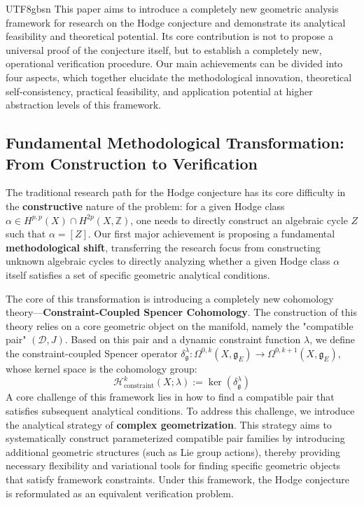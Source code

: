 \documentclass[a4paper,12pt]{extarticle}
\theoremstyle{definition}
\begin{document}
\begin{CJK}{UTF8}{gbsn}
This paper aims to introduce a completely new geometric analysis framework for research on the Hodge conjecture and demonstrate its analytical feasibility and theoretical potential. Its core contribution is not to propose a universal proof of the conjecture itself, but to establish a completely new, operational verification procedure. Our main achievements can be divided into four aspects, which together elucidate the methodological innovation, theoretical self-consistency, practical feasibility, and application potential at higher abstraction levels of this framework.

\subsection{Fundamental Methodological Transformation: From Construction to Verification}

The traditional research path for the Hodge conjecture has its core difficulty in the \textbf{constructive} nature of the problem: for a given Hodge class $\alpha \in H^{p,p}(X) \cap H^{2p}(X, \mathbb{Z})$, one needs to directly construct an algebraic cycle $Z$ such that $\alpha = [Z]$. Our first major achievement is proposing a fundamental \textbf{methodological shift}, transferring the research focus from constructing unknown algebraic cycles to directly analyzing whether a given Hodge class $\alpha$ itself satisfies a set of specific geometric analytical conditions.

The core of this transformation is introducing a completely new cohomology theory—\textbf{Constraint-Coupled Spencer Cohomology}. The construction of this theory relies on a core geometric object on the manifold, namely the "compatible pair" $(\mathcal{D}, J)$. Based on this pair and a dynamic constraint function $\lambda$, we define the constraint-coupled Spencer operator $\delta^\lambda_\mathfrak{g}: \Omega^{0,k}(X, \mathfrak{g}_E) \to \Omega^{0,k+1}(X, \mathfrak{g}_E)$, whose kernel space is the cohomology group:
\begin{equation}
\mathcal{H}_{\text{constraint}}^{k}(X; \lambda) := \ker(\delta^\lambda_\mathfrak{g})
\end{equation}
A core challenge of this framework lies in how to find a compatible pair that satisfies subsequent analytical conditions. To address this challenge, we introduce the analytical strategy of \textbf{complex geometrization}. This strategy aims to systematically construct parameterized compatible pair families by introducing additional geometric structures (such as Lie group actions), thereby providing necessary flexibility and variational tools for finding specific geometric objects that satisfy framework constraints. Under this framework, the Hodge conjecture is reformulated as an equivalent verification problem.


\end{CJK}
\end{document}
